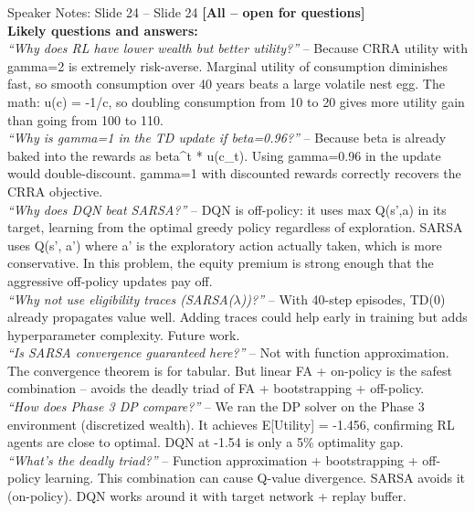 \documentclass[aspectratio=169, 11pt]{beamer}
\begin{document}
\begin{frame}[allowframebreaks]{Speaker Notes: Slide 24 -- Slide 24}
\textbf{[All -- open for questions]}\\
\textbf{Likely questions and answers:}\\[0.3em]
\textit{``Why does RL have lower wealth but better utility?''} -- Because CRRA utility with gamma=2 is extremely risk-averse. Marginal utility of consumption diminishes fast, so smooth consumption over 40 years beats a large volatile nest egg. The math: u(c) = -1/c, so doubling consumption from 10 to 20 gives more utility gain than going from 100 to 110.\\[0.3em]
\textit{``Why is gamma=1 in the TD update if beta=0.96?''} -- Because beta is already baked into the rewards as beta\^{}t * u(c\_t). Using gamma=0.96 in the update would double-discount. gamma=1 with discounted rewards correctly recovers the CRRA objective.\\[0.3em]
\textit{``Why does DQN beat SARSA?''} -- DQN is off-policy: it uses max Q(s',a) in its target, learning from the optimal greedy policy regardless of exploration. SARSA uses Q(s', a') where a' is the exploratory action actually taken, which is more conservative. In this problem, the equity premium is strong enough that the aggressive off-policy updates pay off.\\[0.3em]
\textit{``Why not use eligibility traces (SARSA($\lambda$))?''} -- With 40-step episodes, TD(0) already propagates value well. Adding traces could help early in training but adds hyperparameter complexity. Future work.\\[0.3em]
\textit{``Is SARSA convergence guaranteed here?''} -- Not with function approximation. The convergence theorem is for tabular. But linear FA + on-policy is the safest combination -- avoids the deadly triad of FA + bootstrapping + off-policy.\\[0.3em]
\textit{``How does Phase 3 DP compare?''} -- We ran the DP solver on the Phase 3 environment (discretized wealth). It achieves E[Utility] = -1.456, confirming RL agents are close to optimal. DQN at -1.54 is only a 5\% optimality gap.\\[0.3em]
\textit{``What's the deadly triad?''} -- Function approximation + bootstrapping + off-policy learning. This combination can cause Q-value divergence. SARSA avoids it (on-policy). DQN works around it with target network + replay buffer.
\end{frame}
\end{document}
